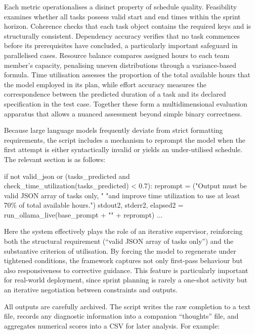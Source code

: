 \documentclass{report}
\begin{document}
Each metric operationalises a disinct property of schedule quality.
Feasibility examines whether all tasks possess valid start and end times within the sprint horizon. 
Coherence checks that each task object contains the required keys and is structurally consistent. 
Dependency accuracy verifies that no task commences before its prerequisites have concluded, a particularly important safeguard in parallelised cases. 
Resource balance compares assigned hours to each team member’s capacity, penalising uneven distributions through a variance-based formula. 
Time utilisation assesses the proportion of the total available hours that the model employed in its plan, while effort accuracy measures the correspondence between the predicted duration of a task and its declared specification in the test case. 
Together these form a multidimensional evaluation apparatus that allows a nuanced assessment beyond simple binary correctness.

Because large language models frequently deviate from strict formatting requirements, the script includes a mechanism to reprompt the model when the first attempt is either syntactically invalid or yields an under-utilised schedule. 
The relevant section is as follows:

\begin{python}
    if not valid_json or (tasks_predicted and check_time_utilization(tasks_predicted) < 0.7):
    reprompt = ("Output must be valid JSON array of tasks only, "
                "and improve time utilization to use at least 70\% of total available hours.")
    stdout2, stderr2, elapsed2 = run_ollama_live(base_prompt + "\n" + reprompt)
    ...

\end{python}

Here the system effectively plays the role of an iterative supervisor, reinforcing both the structural requirement (“valid JSON array of tasks only”) and the substantive criterion of utilisation. 
By forcing the model to regenerate under tightened conditions, the framework captures not only first-pass behaviour but also responsiveness to corrective guidance. 
This feature is particularly important for real-world deployment, since sprint planning is rarely a one-shot activity but an iterative negotiation between constraints and outputs.

All outputs are carefully archived. 
The script writes the raw completion to a text file, records any diagnostic information into a companion “thoughts” file, and aggregates numerical scores into a CSV for later analysis. 
For example:
\end{document}
